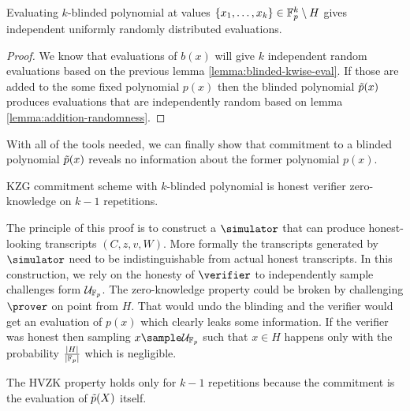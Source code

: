 \begin{lemma}
\label{lemma:blinded-kwise-eval}
    Evaluating $k$-blinded polynomial at values $\{x_1, \ldots, x_k\} \in \mathbb{F}_p^k \setminus H$ gives independent uniformly randomly distributed evaluations.
\end{lemma}

\begin{proof}
    We know that evaluations of $b(x)$ will give $k$ independent random evaluations based on the previous lemma \eqref{lemma:blinded-kwise-eval}. If those are added to the some fixed polynomial $p(x)$ then the blinded polynomial $\Tilde{p}(x)$ produces evaluations that are independently random based on lemma \eqref{lemma:addition-randomness}.
\end{proof}

With all of the tools needed, we can finally show that commitment to a blinded polynomial $\Tilde{p}(x)$ reveals no information about the former polynomial $p(x)$. 

\begin{theorem}
\label{theorem:blinding}
    KZG commitment scheme with $k$-blinded polynomial is honest verifier zero-knowledge on $k-1$ repetitions.
\end{theorem}

The principle of this proof is to construct a $\simulator$ that can produce honest-looking transcripts $(C, z, v, W)$. More formally the transcripts generated by $\simulator$ need to be indistinguishable from actual honest transcripts. In this construction, we rely on the honesty of $\verifier$ to independently sample challenges form $\mathcal{U}_{\mathbb{F}_p}$. The zero-knowledge property could be broken by challenging $\prover$ on point from $H$. That would undo the blinding and the verifier would get an evaluation of $p(x)$ which clearly leaks some information. If the verifier was honest then sampling $x \sample \mathcal{U}_{\mathbb{F}_p}$ such that $x \in H$ happens only with the probability $\frac{|H|}{|\mathbb{F}_p|}$ which is negligible.

The HVZK property holds only for $k-1$ repetitions because the commitment is the evaluation of $\Tilde{p}(X)$ itself. 


